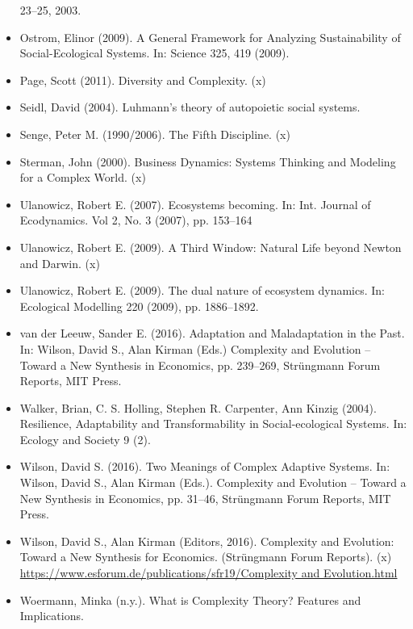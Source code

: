 \documentclass[11pt,a4paper]{article}
\begin{document}
\begin{itemize}
  23--25, 2003.
\item Ostrom, Elinor (2009). A General Framework for Analyzing Sustainability
  of Social-Ecological Systems. In: Science 325, 419 (2009). 
\item Page, Scott (2011). Diversity and Complexity. (x)
\item Seidl, David (2004). Luhmann’s theory of autopoietic social systems.
\item Senge, Peter M. (1990/2006). The Fifth Discipline. (x)
\item Sterman, John (2000). Business Dynamics: Systems Thinking and Modeling
  for a Complex World.  (x)
\item Ulanowicz, Robert E. (2007).  Ecosystems becoming. In: Int. Journal of
  Ecodynamics. Vol 2, No. 3 (2007), pp. 153--164 
\item Ulanowicz, Robert E. (2009). A Third Window: Natural Life beyond Newton
  and Darwin.  (x)
\item Ulanowicz, Robert E. (2009). The dual nature of ecosystem dynamics.
  In: Ecological Modelling 220 (2009), pp. 1886–1892. 
\item van der Leeuw, Sander E. (2016). Adaptation and Maladaptation in the
  Past. In: Wilson, David S., Alan Kirman (Eds.) Complexity and Evolution --
  Toward a New Synthesis in Economics, pp. 239--269, Strüngmann Forum Reports,
  MIT Press.
\item Walker, Brian, C. S. Holling, Stephen R. Carpenter, Ann Kinzig (2004).
  Resilience, Adaptability and Transformability in Social-ecological Systems. 
  In: Ecology and Society 9 (2).
\item Wilson, David S. (2016). Two Meanings of Complex Adaptive Systems. In:
  Wilson, David S., Alan Kirman (Eds.).  Complexity and Evolution -- Toward a
  New Synthesis in Economics, pp. 31–46, Strüngmann Forum Reports, MIT Press.
\item Wilson, David S., Alan Kirman (Editors, 2016). Complexity and Evolution:
  Toward a New Synthesis for Economics. (Strüngmann Forum Reports).  (x)\\
  \url{https://www.esforum.de/publications/sfr19/Complexity and Evolution.html}
\item Woermann, Minka (n.y.). What is Complexity Theory? Features and
  Implications. 
\end{itemize}
\end{document}

